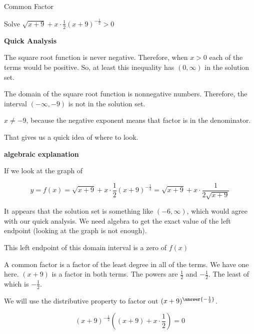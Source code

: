 \documentclass{ximera}
\begin{document}
\begin{example}  Common Factor


Solve $\sqrt{x+9} + x \cdot \frac{1}{2} (x+9)^{-\tfrac{1}{2}} > 0$





\textbf{\textcolor{blue!55!black}{Quick Analysis}} 


The square root function is never negative.  Therefore, when $x > 0$ each of the terms would be positive.  So, at least this inequality has $(0, \infty)$ in the solution set.  


The domain of the square root function is nonnegative numbers.  Therefore, the interval $(-\infty, -9)$ is not in the solution set.   


$x \ne -9$, because the negative exponent means that factor is in the denominator.





That gives us a quick idea of where to look.


\textbf{\textcolor{red!75!green}{algebraic explanation}} 





If we look at the graph of  

\[
y = f(x) = \sqrt{x+9} + x \cdot \frac{1}{2} (x+9)^{-\tfrac{1}{2}} = \sqrt{x+9} + x \cdot \frac{1}{2 \sqrt{x+9}} 
\]




\begin{center}
\end{center}




It appears that the solution set is something like  $(-6, \infty)$, which would agree with our quick analysis.  We need algebra to get the exact value of the left endpoint (looking at the graph is not enough).


This left endpoint of this domain interval is a zero of $f(x)$ 






A common factor is a factor of the least degree in all of the terms.  We have one here. $(x+9)$ is a factor in both terms.  The powers are $\frac{1}{2}$ and $-\frac{1}{2}$. The least of which is $-\frac{1}{2}$.

We will use the distributive property to factor out $(x+9)^{\answer{-\frac{1}{2}}}$.


\[ (x+9)^{-\tfrac{1}{2}} \left((x+9) + x \cdot \frac{1}{2}\right)  = 0 \]



\end{example}
\end{document}
